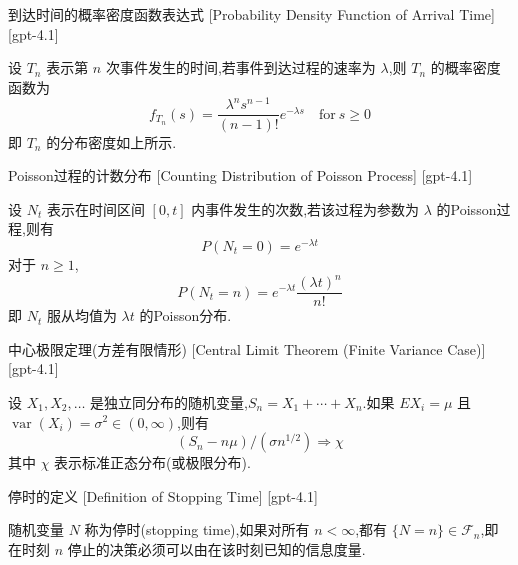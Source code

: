 \documentclass[UTF8]{ctexart}
\begin{document}
    
    
    \begin{thm}
        {到达时间的概率密度函数表达式}
        [Probability Density Function of Arrival Time]
        [gpt-4.1]
        
设 $T_n$ 表示第 $n$ 次事件发生的时间,若事件到达过程的速率为 $\lambda$,则 $T_n$ 的概率密度函数为
\[
f_{T_{n}}(s) = \frac{\lambda^{n} s^{n-1}}{(n-1)!} e^{-\lambda s} \quad \mathrm{for}\ s \geq 0
\]
即 $T_n$ 的分布密度如上所示.

    \end{thm}
    
    
    
    \begin{thm}
        {Poisson过程的计数分布}
        [Counting Distribution of Poisson Process]
        [gpt-4.1]
        
设 $N_t$ 表示在时间区间 $[0, t]$ 内事件发生的次数,若该过程为参数为 $\lambda$ 的Poisson过程,则有
\[
P(N_{t} = 0) = e^{-\lambda t}
\]
对于 $n \geq 1$,
\[
P(N_{t} = n) = e^{-\lambda t} \frac{(\lambda t)^{n}}{n!}
\]
即 $N_t$ 服从均值为 $\lambda t$ 的Poisson分布.

    \end{thm}
    
    
    
    \begin{thm}
        {中心极限定理(方差有限情形)}
        [Central Limit Theorem (Finite Variance Case)]
        [gpt-4.1]
        
设 $X_1, X_2, \dots$ 是独立同分布的随机变量,$S_n = X_1 + \cdots + X_n$.如果 $E X_i = \mu$ 且 $\operatorname{var}(X_i) = \sigma^2 \in (0, \infty)$,则有
\[
(S_n - n\mu) / (\sigma n^{1/2}) \Rightarrow \chi
\]
其中 $\chi$ 表示标准正态分布(或极限分布).

    \end{thm}
    
    
    
    \begin{dfn}
        {停时的定义}
        [Definition of Stopping Time]
        [gpt-4.1]
        
随机变量 $N$ 称为停时(stopping time),如果对所有 $n < \infty$,都有 $\{N = n\} \in \mathcal{F}_n$,即在时刻 $n$ 停止的决策必须可以由在该时刻已知的信息度量.

    \end{dfn}
    
\end{document}

